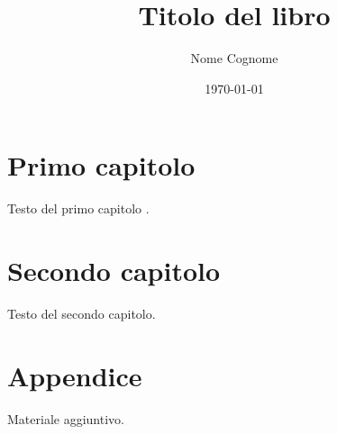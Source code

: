 \documentclass[11pt,a4paper]{book}
\title{Titolo del libro}
\author{Nome Cognome}
\date{\today}
\begin{document}
\frontmatter
\maketitle
\tableofcontents

\mainmatter
\chapter{Primo capitolo}
Testo del primo capitolo \cite{knuth1986}.

\chapter{Secondo capitolo}
Testo del secondo capitolo.

\backmatter
\appendix
\chapter{Appendice}
Materiale aggiuntivo.
\end{document}
